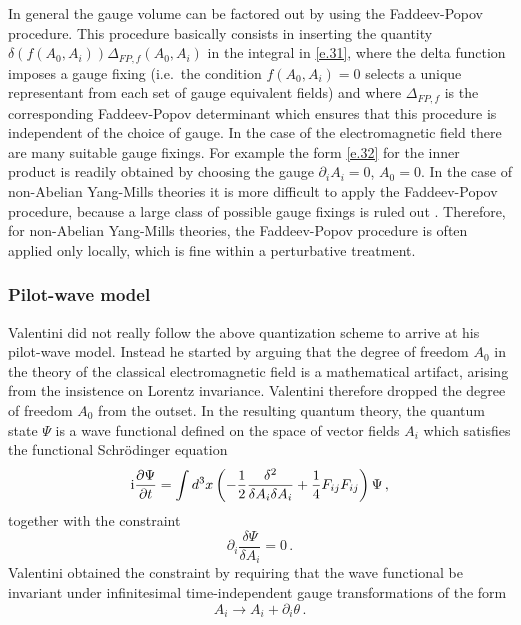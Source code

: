 \documentclass[12pt]{article}
\def\ii{\textrm i}
\begin{document}
In general the gauge volume can be factored out by using the Faddeev-Popov procedure. This procedure basically consists in inserting the quantity $\delta(f(A_0,A_i))\Delta_{FP,f}(A_0,A_i)$ in the integral in \eqref{e.31}, where the delta function imposes a gauge fixing (i.e.\ the condition $f(A_0,A_i)=0$ selects a unique representant from each set of gauge equivalent fields) and where $\Delta_{FP,f}$ is the corresponding Faddeev-Popov determinant which ensures that this procedure is independent of the choice of gauge. In the case of the electromagnetic field there are many suitable gauge fixings. For example the form \eqref{e.32} for the inner product is readily obtained by choosing the gauge $\partial_i A_i = 0$, $A_0=0$. In the case of non-Abelian Yang-Mills theories it is more difficult to apply the Faddeev-Popov procedure, because a large class of possible gauge fixings is ruled out \cite{gribov78,singer78,chodos80}. Therefore, for non-Abelian Yang-Mills theories, the Faddeev-Popov procedure is often applied only locally, which is fine within a perturbative treatment.


\subsubsection{Pilot-wave model}
Valentini did not really follow the above quantization scheme to arrive at his pilot-wave model. Instead he started by arguing that the degree of freedom $A_0$ in the theory of the classical electromagnetic field is a mathematical artifact, arising from the insistence on Lorentz invariance. Valentini therefore dropped the degree of freedom $A_0$ from the outset. In the resulting quantum theory, the quantum state $\Psi$ is a wave functional defined on the space of vector fields $A_i$ which satisfies the functional Schr{\"o}\-ding\-er equation
\begin{equation}
\ii \frac{\partial \Psi}{\partial t}=  \int d^3 x \left( -\frac{1}{2}\frac{\delta^2}{\delta  A_{i}\delta  A_{i}} + \frac{1}{4}F_{ij}F_{ij}  \right)\Psi \,,
\label{64.003}
\end{equation}
together with the constraint
\begin{equation}
\partial_i \frac{\delta \Psi}{\delta  A_{i}} =0\,.
\label{64.004}
\end{equation}
Valentini obtained the constraint by requiring that the wave functional be invariant under infinitesimal time-independent gauge transformations of the form
\begin{equation}
A_i \to A_i + \partial_i \theta\,.
\label{64.005}
\end{equation}
\end{document}
